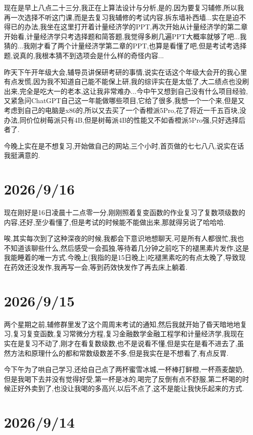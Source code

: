 现在是早上八点二十三分,我正在上算法设计与分析,是的,因为要复习辅修,所以我再一次选择不听这门课,而是去复习我辅修的考试内容,拆东墙补西墙...实在是迫不得已的办法,我坐在这里打开着计量经济学的PPT,再次开始从计量经济学的第二章开始看,计量经济学只考选择题和简答题,我觉得多刷几遍PPT大概率就够了吧...我猜的...我刚才看了两个计量经济学第二章的PPT,也算是看懂了吧,但是考试考选择题,说真的,我根本猜不到选项会是什么样的奇怪内容...

昨天下午开年级大会,辅导员讲保研考研的事情,说实在话这个年级大会开的我心里有点发慌,因为我不知道自己能不能保上研,我的综评实在是太低了,大二绩点也没刷出来,完全是吃大一的老本,这让我非常难办...今中午又想到自己没有什么项目经验,又紧急问ChatGPT自己这一年能做哪些项目,它给了很多,我想一个一个来,但是又考虑到自己的电脑是x86的,所以又去买了一个香橙派5Pro,花了将近一千五百块,没办法,同价位树莓派只有4B,但是树莓派4B的性能又不如香橙派5Pro强,只好选择后者了.

今晚上实在是不想复习,开始做自己的网站,三个小时,首页做的七七八八,说实在话我挺满意的.
\section*{2026/9/16}

现在刚好是16日凌晨十二点零一分,刚刚照着复变函数的作业复习了复数项级数的内容,还好,至少看懂了,但是考试的时候能不能做出来,那就得另说了哈哈哈.

唉,其实每次到了这种深夜的时候,我都会下意识地想聊天,可是所有人都很忙,我也不知道该聊些什么,然后感受一会孤独,等待着几分钟之前吃下的褪黑素片发作,这是我能睡着的唯一方式.今晚上(我指的是15日晚上)吃褪黑素吃的有点太晚了,导致现在药效还没发作,我再写一会,等到药效快发作了再去床上躺着.
	
\section*{2026/9/15}

两个星期之前,辅修群里发了这个周周末考试的通知,然后我就开始了昏天暗地地复习,复习复变函数,复习常微分方程,复习金融数学金融工程学和计量经济学,我现在实在是复习不动了,刚才在看复数级数,也不是说看不懂,但是实在是看不进去了,虽然方法和原理什么的都和常数级数差不多,但是我实在是不想看了,有点反胃.

今下午为了哄自己学习,还给自己点了两杯蜜雪冰城,一杯棒打鲜橙,一杯燕麦酸奶,但是我喝下去并没有觉得好受,第一杯是冰的,喝完了反倒有点不舒服,第二杯喝的时候正好外卖到了,也没让我喝的多高兴,以后不点了,这不是能让我快乐起来的方式.

\section*{2026/9/14}

